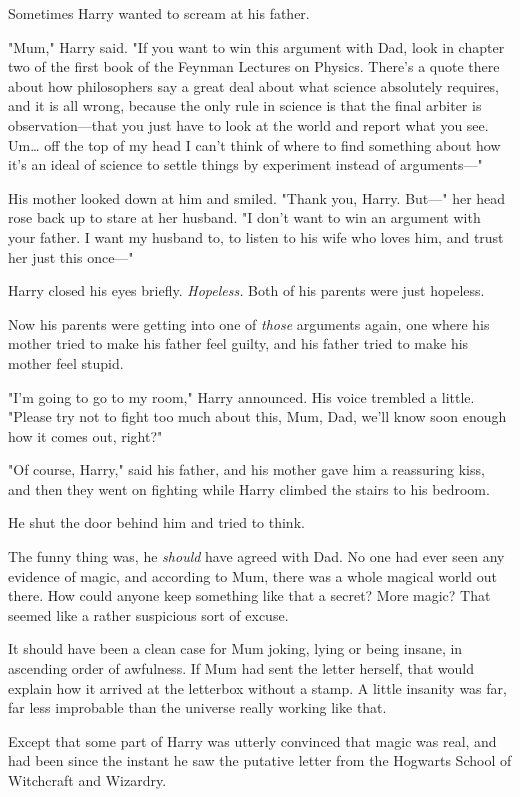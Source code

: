 Sometimes Harry wanted to scream at his father.

"Mum," Harry said. "If you want to win this argument with Dad, look in chapter 
two of the first book of the Feynman Lectures on Physics. There's a quote there 
about how philosophers say a great deal about what science absolutely requires, 
and it is all wrong, because the only rule in science is that the final arbiter 
is observation---that you just have to look at the world and report what you 
see. Um{\ldots} off the top of my head I can't think of where to find something 
about how it's an ideal of science to settle things by experiment instead of 
arguments---"

His mother looked down at him and smiled. "Thank you, Harry. But---" her head 
rose back up to stare at her husband. "I don't want to win an argument with 
your father. I want my husband to, to listen to his wife who loves him, and 
trust her just this once---"

Harry closed his eyes briefly. \emph{Hopeless.} Both of his parents were just 
hopeless.

Now his parents were getting into one of \emph{those} arguments again, one 
where his mother tried to make his father feel guilty, and his father tried to 
make his mother feel stupid.

"I'm going to go to my room," Harry announced. His voice trembled a little. 
"Please try not to fight too much about this, Mum, Dad, we'll know soon enough 
how it comes out, right?"

"Of course, Harry," said his father, and his mother gave him a reassuring kiss, 
and then they went on fighting while Harry climbed the stairs to his bedroom.

He shut the door behind him and tried to think.

The funny thing was, he \emph{should} have agreed with Dad. No one had ever 
seen any evidence of magic, and according to Mum, there was a whole magical 
world out there. How could anyone keep something like that a secret? More 
magic? That seemed like a rather suspicious sort of excuse.

It should have been a clean case for Mum joking, lying or being insane, in 
ascending order of awfulness. If Mum had sent the letter herself, that would 
explain how it arrived at the letterbox without a stamp. A little insanity was 
far, far less improbable than the universe really working like that.

Except that some part of Harry was utterly convinced that magic was real, and 
had been since the instant he saw the putative letter from the Hogwarts School 
of Witchcraft and Wizardry.

